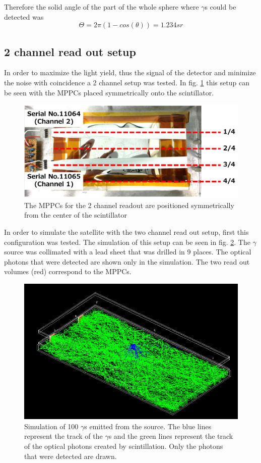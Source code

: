 \documentclass[12pt, a4paper,titlepage]{article}
\numberwithin{equation}{section}
\numberwithin{figure}{section}
\begin{document}
Therefore the solid angle of the part of the whole sphere where $\gamma$s could be detected was 
$$\Theta = 2 \pi (1-cos(\theta)) = 1.234 sr$$

\pagebreak

\subsection{2 channel read out setup}

In order to maximize the light yield, thus the signal of the detector and minimize the noise with coincidence a 2 channel setup was tested.  In fig. \ref{fig:schem2c} this setup can be seen with the MPPCs placed symmetrically onto the scintillator.

\begin{figure}[h!]
\centering
\includegraphics[width=130.0mm]{images/2channelsetup.png}
\caption{The MPPCs for the 2 channel readout are positioned symmetrically from the center of the scintillator \cite{kento}}
\label{fig:schem2c}
\end{figure}

In order to simulate the satellite with the two channel read out setup, first this configuration was tested. The simulation of this setup can be seen in fig. \ref{fig:sim2ch}. The $\gamma$ source was collimated with a lead sheet that was drilled in 9 places. The optical photons that were detected are shown only in the simulation. The two read out volumes (red) correspond to the MPPCs.

\begin{figure}[h!]
\centering
\includegraphics[width=130.0mm]{images/2channel.png}
\caption{Simulation of 100 $\gamma$s emitted from the source. The blue lines represent the track of the $\gamma$s and the green lines represent the track of the optical photons created by scintillation. Only the photons that were detected are drawn.}
\label{fig:sim2ch}
\end{figure}
\end{document}
